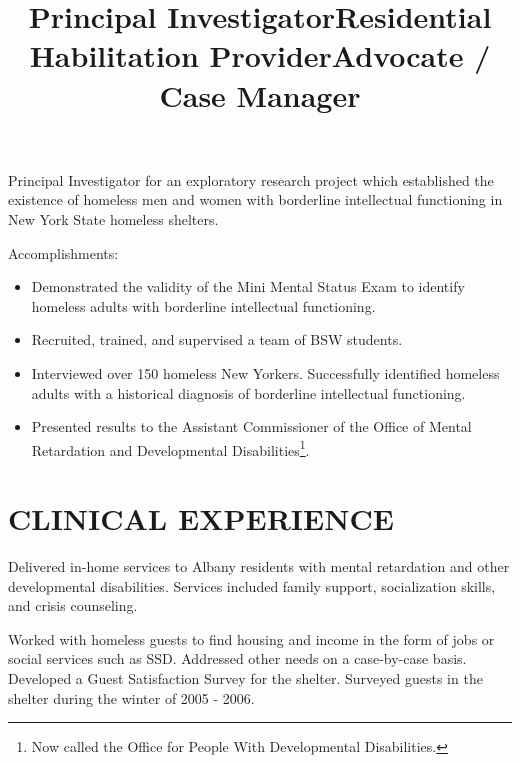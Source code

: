 \documentclass[line, margin, 10pt]{res}
\begin{document}
\begin{resume}
  \title{Principal Investigator}
  \begin{position}
    Principal Investigator for an exploratory research project which
    established the existence of homeless men and women with
    borderline intellectual functioning in New York State homeless
    shelters.

    Accomplishments:
    \begin{itemize}
    \item Demonstrated the validity of the Mini Mental Status Exam to
      identify homeless adults with borderline intellectual functioning.
    \item Recruited, trained, and supervised a team of BSW students.
    \item Interviewed over 150 homeless New Yorkers. Successfully
      identified homeless adults with a historical diagnosis of
      borderline intellectual functioning.
    \item Presented results to the Assistant Commissioner
      of the Office of Mental Retardation and Developmental
      Disabilities\footnote{Now called the Office for People With
        Developmental Disabilities.}.
    \end{itemize}
  \end{position}


  \section{CLINICAL EXPERIENCE}

  \title{Residential Habilitation Provider}
  \begin{position}
    Delivered in-home services to Albany residents with mental
    retardation and other developmental disabilities. Services included
    family support, socialization skills, and crisis counseling.
  \end{position}

  \title{Advocate / Case Manager}
  \begin{position}
    Worked with homeless guests to find housing and income in the form
    of jobs or social services such as SSD. Addressed other needs on a case-by-case
    basis. Developed a Guest Satisfaction Survey for the shelter. Surveyed
    guests in the shelter during the winter of 2005 - 2006.
  \end{position}


\end{resume}
\end{document}
